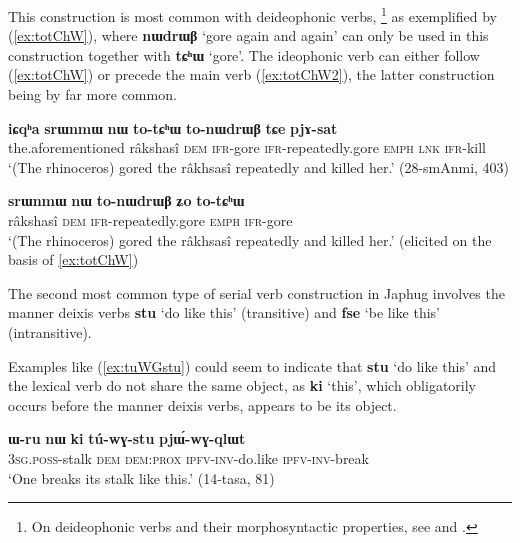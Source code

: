 \documentclass[oneside,a4paper,11pt]{article}
\newcommand{\ipa}[1]{\textbf{\phon#1}} %
\newcommand{\jpg}[2]{\ipa{#1} `#2'} %
\begin{document}
This construction is most common with deideophonic verbs, \footnote{On deideophonic verbs and their morphosyntactic properties, see \citet{jackson04zhuangmaoci} and \citet{japhug14ideophones}.} as exemplified by (\ref{ex:totChW}), where \jpg{nɯdrɯβ}{gore again and again} can only be used in this construction together with \jpg{tɕʰɯ}{gore}. The ideophonic verb can either follow (\ref{ex:totChW}) or precede  the main verb (\ref{ex:totChW2}), the latter construction being by far more common.

\begin{exe}
\ex \label{ex:totChW}
\gll \ipa{iɕqʰa} 	\ipa{srɯnmɯ} 	\ipa{nɯ} 	\ipa{to-tɕʰɯ} 	\ipa{to-nɯdrɯβ}  \ipa{tɕe} 	\ipa{pjɤ-sat} \\
the.aforementioned râkshasî \textsc{dem} \textsc{ifr}-gore \textsc{ifr}-repeatedly.gore \textsc{emph} \textsc{lnk} \textsc{ifr}-kill \\
\glt `(The rhinoceros) gored the râkhsasî repeatedly and killed her.' (28-smAnmi, 403)
\end{exe}

\begin{exe}
\ex \label{ex:totChW2}
\gll 	\ipa{srɯnmɯ} 	\ipa{nɯ} 	\ipa{to-nɯdrɯβ} 	\ipa{ʑo} 	 	\ipa{to-tɕʰɯ} \\
 râkshasî \textsc{dem}  \textsc{ifr}-repeatedly.gore  \textsc{emph}  \textsc{ifr}-gore \\
 \glt `(The rhinoceros) gored the râkhsasî repeatedly and killed her.' (elicited on the basis of \ref{ex:totChW})
\end{exe}	

The second most common type of serial verb construction in Japhug involves the manner deixis verbs \jpg{stu}{do like this} (transitive) and \jpg{fse}{be like this} (intransitive). 

Examples like (\ref{ex:tuWGstu}) could seem to indicate that \jpg{stu}{do like this} and the lexical verb do not share the same object, as  \jpg{ki}{this}, which obligatorily occurs before the manner deixis verbs, appears to be its object. 

\begin{exe}
\ex \label{ex:tuWGstu}
\gll 	
\ipa{ɯ-ru} 	\ipa{nɯ} 	\ipa{ki} 	\ipa{tú-wɣ-stu} 	\ipa{pjɯ́-wɣ-qlɯt} \\
\textsc{3sg.poss}-stalk \textsc{dem} \textsc{dem:prox} \textsc{ipfv-inv}-do.like \textsc{ipfv-inv}-break \\
\glt `One breaks its stalk like this.' (14-tasa, 81)
\end{exe}	
\end{document}
